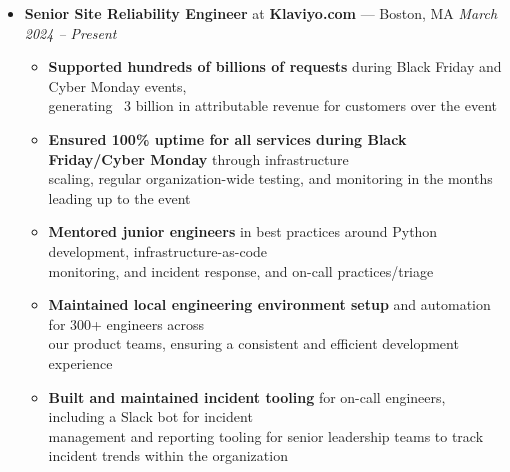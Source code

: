 \documentclass{article}
\begin{document}
\begin{itemize}[label={},leftmargin=*]

  \item \textbf{Senior Site Reliability Engineer} at \textbf{Klaviyo.com} --- Boston, MA \hfill {\em March 2024 -- Present}
  \begin{itemize}[label={$\bullet$}]
    \item \textbf{Supported hundreds of billions of requests} during Black Friday and Cyber Monday events,\\
          generating ~3 billion in attributable revenue for customers over the event
    \item \textbf{Ensured 100\% uptime for all services during Black Friday/Cyber Monday} through infrastructure\\
          scaling, regular organization-wide testing, and monitoring in the months leading up to the event
    \item \textbf{Mentored junior engineers} in best practices around Python development, infrastructure-as-code\\
          monitoring, and incident response, and on-call practices/triage
    \item \textbf{Maintained local engineering environment setup} and automation for 300+ engineers across\\
          our product teams, ensuring a consistent and efficient development experience
    \item \textbf{Built and maintained incident tooling} for on-call engineers, including a Slack bot for incident\\
          management and reporting tooling for senior leadership teams to track incident trends within the organization
  \end{itemize}


\end{itemize}
\end{document}
